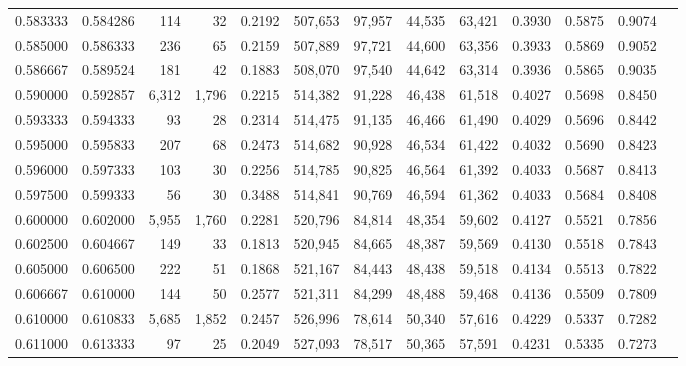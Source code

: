 \begin{tabular}{rrrrrrrrrrrrr}
0.583333 & 0.584286 &    114 &    32 &                                     0.2192 & 507,653 &  97,957 &  44,535 &  63,421 & 0.3930 & 0.5875 & 0.9074 \\
0.585000 & 0.586333 &    236 &    65 &                                     0.2159 & 507,889 &  97,721 &  44,600 &  63,356 & 0.3933 & 0.5869 & 0.9052 \\
0.586667 & 0.589524 &    181 &    42 &                                     0.1883 & 508,070 &  97,540 &  44,642 &  63,314 & 0.3936 & 0.5865 & 0.9035 \\
0.590000 & 0.592857 &  6,312 & 1,796 &                                     0.2215 & 514,382 &  91,228 &  46,438 &  61,518 & 0.4027 & 0.5698 & 0.8450 \\
0.593333 & 0.594333 &     93 &    28 &                                     0.2314 & 514,475 &  91,135 &  46,466 &  61,490 & 0.4029 & 0.5696 & 0.8442 \\
0.595000 & 0.595833 &    207 &    68 &                                     0.2473 & 514,682 &  90,928 &  46,534 &  61,422 & 0.4032 & 0.5690 & 0.8423 \\
0.596000 & 0.597333 &    103 &    30 &                                     0.2256 & 514,785 &  90,825 &  46,564 &  61,392 & 0.4033 & 0.5687 & 0.8413 \\
0.597500 & 0.599333 &     56 &    30 &                                     0.3488 & 514,841 &  90,769 &  46,594 &  61,362 & 0.4033 & 0.5684 & 0.8408 \\
0.600000 & 0.602000 &  5,955 & 1,760 &                                     0.2281 & 520,796 &  84,814 &  48,354 &  59,602 & 0.4127 & 0.5521 & 0.7856 \\
0.602500 & 0.604667 &    149 &    33 &                                     0.1813 & 520,945 &  84,665 &  48,387 &  59,569 & 0.4130 & 0.5518 & 0.7843 \\
0.605000 & 0.606500 &    222 &    51 &                                     0.1868 & 521,167 &  84,443 &  48,438 &  59,518 & 0.4134 & 0.5513 & 0.7822 \\
0.606667 & 0.610000 &    144 &    50 &                                     0.2577 & 521,311 &  84,299 &  48,488 &  59,468 & 0.4136 & 0.5509 & 0.7809 \\
0.610000 & 0.610833 &  5,685 & 1,852 &                                     0.2457 & 526,996 &  78,614 &  50,340 &  57,616 & 0.4229 & 0.5337 & 0.7282 \\
0.611000 & 0.613333 &     97 &    25 &                                     0.2049 & 527,093 &  78,517 &  50,365 &  57,591 & 0.4231 & 0.5335 & 0.7273 \\

\end{tabular}
